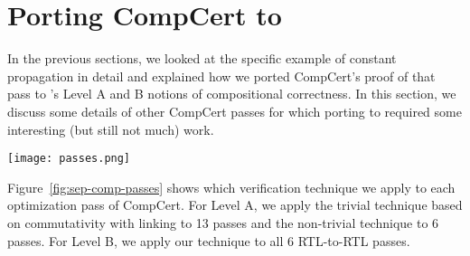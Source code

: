 \section{Porting CompCert to \sepcomp{}}

In the previous sections, we looked at the specific example of
constant propagation in detail and explained how we ported CompCert's
proof of that pass to \sepcomp{}'s Level A and B notions of
compositional correctness.  In this section, we discuss some details
of other CompCert passes for which porting to \sepcomp{} required some
interesting (but still not much) work.

\begin{figure*}[t]
\begin{center}
\texttt{[image: passes.png]}
\end{center}
\caption{Optimization passes of \sepcomp{} Level A and Level B.}
\label{fig:sep-comp-passes}
\end{figure*}

Figure~\ref{fig:sep-comp-passes} shows which verification technique we
apply to each optimization pass of CompCert.  For Level A, we apply
the trivial technique based on commutativity with linking to 13 passes
and the non-trivial technique to 6 passes.  For Level B, we apply our
technique to all 6 RTL-to-RTL passes.




